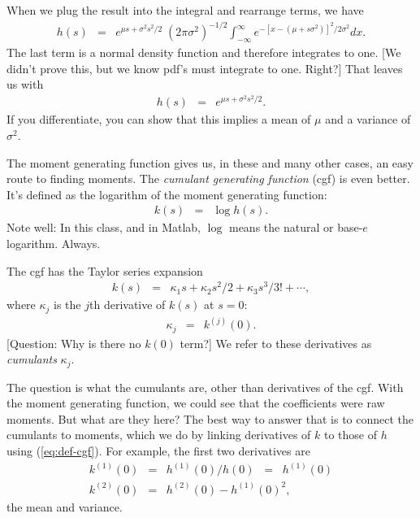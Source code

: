 \begin{itemize}
When we plug the result into the integral and rearrange terms,
we have
\begin{eqnarray*}
        h(s) &=& e^{\mu s + \sigma^2 s^2/2} \; (2\pi \sigma^2)^{-1/2}
        \int_{-\infty}^\infty e^{-[x-(\mu+s\sigma^2)]^2/2\sigma^2} dx .
\end{eqnarray*}
The last term is a normal density function
and therefore integrates to one.
[We didn't prove this, but we know pdf's must integrate to one.  Right?]
That leaves us with
\begin{eqnarray*}
        h(s) &=& e^{\mu s + \sigma^2 s^2/2}  .
\end{eqnarray*}
If you differentiate, you can show that this implies
a mean of $\mu$ and a variance of $\sigma^2$.
\end{itemize}


The moment generating function gives us, in these and many other cases,
an easy route to finding moments.
The {\it cumulant generating function\/} (cgf) is even better.
It's defined as the logarithm of the moment generating function:
\begin{eqnarray}
    k(s) &=& \log h(s) .
    \label{eq:def-cgf}
\end{eqnarray}
Note well:  In this class, and in Matlab,
$\log$ means the natural or base-$e$ logarithm.
Always.

The cgf has the Taylor series expansion
\begin{eqnarray}
    k(s) &=& \kappa_1 s + \kappa_2 s^2/2 + \kappa_3 s^3/3! + \cdots  ,
    \label{eq:cumulant-expansion}
\end{eqnarray}
where $\kappa_j$ is the $j$th derivative of $k(s)$ at $s=0$:
\begin{eqnarray*}
    \kappa_j &=& k^{(j)}(0) .
\end{eqnarray*}
[Question:  Why is there no $k(0)$ term?]
We refer to these derivatives as {\it cumulants\/} $\kappa_j$.

The question is what the cumulants are, other than derivatives of the cgf.
With the moment generating function, we could see that the coefficients
were raw moments.
But what are they here?
The best way to answer that is to connect the cumulants to moments,
which we do by linking derivatives of $k$
to those of $h$ using (\ref{eq:def-cgf}).
For example, the first two derivatives are
\begin{eqnarray*}
    k^{(1)}(0) &=& h^{(1)}(0) / h(0) \;\;=\;\; h^{(1)}(0) \\
    k^{(2)}(0) &=& h^{(2)}(0) - h^{(1)}(0)^2 ,
\end{eqnarray*}
the mean and variance.

